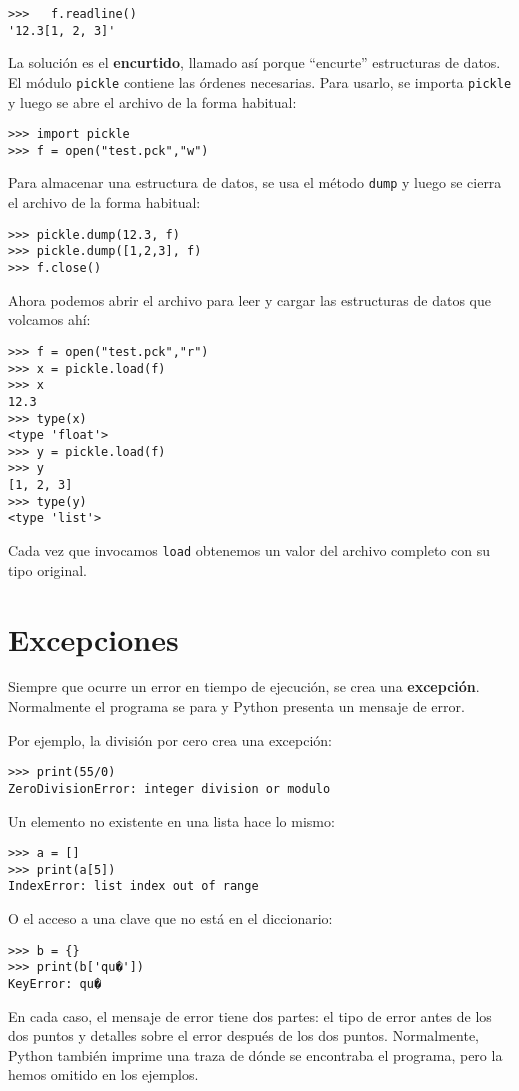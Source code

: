 \begin{lstlisting}
>>>   f.readline()
'12.3[1, 2, 3]'
\end{lstlisting}
 La solución es el \textbf{encurtido}, llamado así porque ``encurte''
estructuras de datos. El módulo \texttt{pickle} contiene las órdenes
necesarias. Para usarlo, se importa \texttt{pickle} y luego se abre
el archivo de la forma habitual:
\begin{lstlisting}
>>> import pickle
>>> f = open("test.pck","w")
\end{lstlisting}
Para almacenar una estructura de datos, se usa el método \texttt{dump}
y luego se cierra el archivo de la forma habitual:
\begin{lstlisting}
>>> pickle.dump(12.3, f)
>>> pickle.dump([1,2,3], f)
>>> f.close()
\end{lstlisting}
Ahora podemos abrir el archivo para leer y cargar las estructuras
de datos que volcamos ahí:

\begin{lstlisting}
>>> f = open("test.pck","r")
>>> x = pickle.load(f)
>>> x
12.3
>>> type(x)
<type 'float'>
>>> y = pickle.load(f)
>>> y
[1, 2, 3]
>>> type(y)
<type 'list'>
\end{lstlisting}
 Cada vez que invocamos \texttt{load} obtenemos un valor del archivo
completo con su tipo original.

\section{Excepciones}

  
  

Siempre que ocurre un error en tiempo de ejecución, se crea una \textbf{excepción}.
Normalmente el programa se para y Python presenta un mensaje de error.

Por ejemplo, la división por cero crea una excepción:
\begin{lstlisting}
>>> print(55/0)
ZeroDivisionError: integer division or modulo
\end{lstlisting}
Un elemento no existente en una lista hace lo mismo:
\begin{lstlisting}
>>> a = []
>>> print(a[5])
IndexError: list index out of range
\end{lstlisting}
O el acceso a una clave que no está en el diccionario:
\begin{lstlisting}
>>> b = {}
>>> print(b['qu�'])
KeyError: qu�
\end{lstlisting}
En cada caso, el mensaje de error tiene dos partes: el tipo de error
antes de los dos puntos y detalles sobre el error después de los dos
puntos. Normalmente, Python también imprime una traza de dónde se
encontraba el programa, pero la hemos omitido en los ejemplos.

